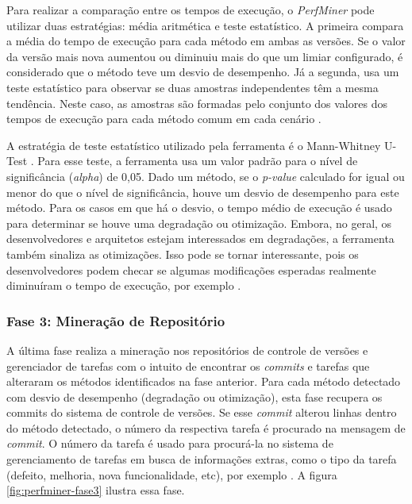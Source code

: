Para realizar a comparação entre os tempos de execução, o \textit{PerfMiner} pode utilizar duas estratégias: média aritmética e teste estatístico. A primeira compara a média do tempo de execução para cada método em ambas as versões. Se o valor da versão mais nova aumentou ou diminuiu mais do que um limiar configurado, é considerado que o método teve um desvio de desempenho. Já a segunda, usa um teste estatístico para observar se duas amostras independentes têm a mesma tendência. Neste caso, as amostras são formadas pelo conjunto dos valores dos tempos de execução para cada método comum em cada cenário \cite{Pinto2015}.

A estratégia de teste estatístico utilizado pela ferramenta é o Mann-Whitney U-Test \cite{Neuhauser2011}. Para esse teste, a ferramenta usa um valor padrão para o nível de significância (\textit{alpha}) de 0,05. Dado um método, se o \textit{p-value} calculado for igual ou menor do que o nível de significância, houve um desvio de desempenho para este método. Para os casos em que há o desvio, o tempo médio de execução é usado para determinar se houve uma degradação ou otimização. Embora, no geral, os desenvolvedores e arquitetos estejam interessados em degradações, a ferramenta também sinaliza as otimizações. Isso pode se tornar interessante, pois os desenvolvedores podem checar se algumas modificações esperadas realmente diminuíram o tempo de execução, por exemplo \cite{Pinto2015}.

\subsubsection{Fase 3: Mineração de Repositório} \label{subsec:fase3}

A última fase realiza a mineração nos repositórios de controle de versões e gerenciador de tarefas com o intuito de encontrar os \textit{commits} e tarefas que alteraram os métodos identificados na fase anterior. Para cada método detectado com desvio de desempenho (degradação ou otimização), esta fase recupera os commits do sistema de controle de versões. Se esse \textit{commit} alterou linhas dentro do método detectado, o número da respectiva tarefa é procurado na mensagem de \textit{commit}. O número da tarefa é usado para procurá-la no sistema de gerenciamento de tarefas em busca de informações extras, como o tipo da tarefa (defeito, melhoria, nova funcionalidade, etc), por exemplo \cite{Pinto2015}. A figura \ref{fig:perfminer-fase3} ilustra essa fase.

